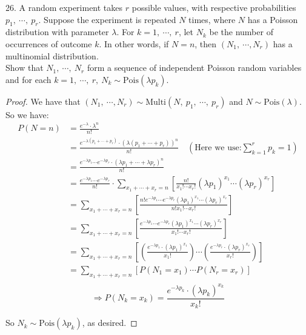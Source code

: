 \documentclass{article}
\newcommand{\parens}[1]{\left(#1\right)}
\newcommand{\sqbracks}[1]{\left[#1\right]}
\newcommand{\distrib}[2]{\text{#1}\left(#2\right)}
\begin{document}
	\item[26.] A random experiment takes $r$ possible values, with respective probabilities
$p_1,\ \cdots,\ p_r$. Suppose the experiment is repeated $N$ times, where $N$ has a Poisson
distribution with parameter $\lambda$. For $k = 1,\ \cdots ,\ r$, let $N_k$ be the number of
occurrences of outcome $k$. In other words, if $N = n$, then $\parens{N_1,\ \cdots , N_r}$ has
a multinomial distribution.\\
Show that $N_1,\ \cdots ,\ N_r$ form a sequence of independent Poisson random
variables and for each $k = 1,\ \cdots ,\ r,\ N_k \sim \text{Pois}\parens{\lambda p_k}$.
	\begin{proof}
	We have that $\parens{N_1,\ \cdots , N_r} \sim \distrib{Multi}{N,\ p_1,\ \cdots,\ p_r}$ and $N \sim \distrib{Pois}{\lambda}$. So we have:
	\begin{align*}
	P\parens{N = n} &= \frac{e^{-\lambda}\cdot\lambda^n}{n!}\\
	&= \frac{e^{-\lambda\parens{p_1 + \cdots + p_r}}\cdot\parens{\lambda\parens{p_1 + \cdots + p_r}}^n}{n!}\quad \parens{\text{Here we use:} \sum_{k = 1}^r p_k = 1}\\
	&= \frac{e^{-\lambda p_1} \cdots e^{-\lambda p_r}\cdot\parens{\lambda p_1 + \cdots + \lambda p_r}^n}{n!}\\
	&= \frac{e^{-\lambda p_1} \cdots e^{-\lambda p_r}}{n!}\cdot \sum_{x_1 + \cdots + x_r = n}\sqbracks{\frac{n!}{x_1!\cdots x_r!}\parens{\lambda p_1}^{x_1}\cdots\parens{\lambda p_r}^{x_r} }\\
	&= \sum_{x_1 + \cdots + x_r = n}\sqbracks{\frac{n!e^{-\lambda p_1} \cdots e^{-\lambda p_r}\parens{\lambda p_1}^{x_1}\cdots\parens{\lambda p_r}^{x_r}}{n!x_1!\cdots x_r!} }\\
	&= \sum_{x_1 + \cdots + x_r = n}\sqbracks{\frac{e^{-\lambda p_1} \cdots e^{-\lambda p_r}\parens{\lambda p_1}^{x_1}\cdots\parens{\lambda p_r}^{x_r}}{x_1!\cdots x_r!}}\\
	&= \sum_{x_1 + \cdots + x_r = n}\sqbracks{\parens{\frac{e^{-\lambda p_1}\cdot\parens{\lambda p_1}^{x_1}}{x_1!}}\cdots\parens{\frac{e^{-\lambda p_r}\cdot\parens{\lambda p_r}^{x_r}}{x_r!}}}\\
	&= \sum_{x_1 + \cdots + x_r = n}\sqbracks{P\parens{N_1=x_1}\cdots P\parens{N_r = x_r}}\\
	\end{align*}
	$$\Rightarrow P\parens{N_k = x_k} = \frac{e^{-\lambda p_k}\cdot\parens{\lambda p_k}^{x_k}}{x_k!}$$
	
	So $N_k \sim \distrib{Pois}{\lambda p_k}$, as desired.
	\end{proof}
	
\end{document}
